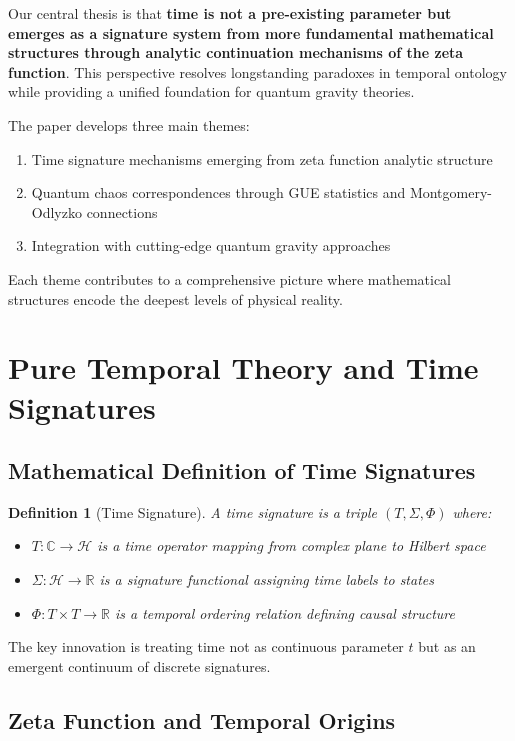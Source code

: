 \documentclass[12pt]{article}
\newtheorem{definition}[theorem]{Definition}
\begin{document}
Our central thesis is that \textbf{time is not a pre-existing parameter but emerges as a signature system from more fundamental mathematical structures through analytic continuation mechanisms of the zeta function}. This perspective resolves longstanding paradoxes in temporal ontology while providing a unified foundation for quantum gravity theories.

The paper develops three main themes:
\begin{enumerate}
\item Time signature mechanisms emerging from zeta function analytic structure
\item Quantum chaos correspondences through GUE statistics and Montgomery-Odlyzko connections
\item Integration with cutting-edge quantum gravity approaches
\end{enumerate}

Each theme contributes to a comprehensive picture where mathematical structures encode the deepest levels of physical reality.

\section{Pure Temporal Theory and Time Signatures}

\subsection{Mathematical Definition of Time Signatures}

\begin{definition}[Time Signature]
A time signature is a triple $(T, \Sigma, \Phi)$ where:
\begin{itemize}
\item $T: \mathbb{C} \to \mathcal{H}$ is a time operator mapping from complex plane to Hilbert space
\item $\Sigma: \mathcal{H} \to \mathbb{R}$ is a signature functional assigning time labels to states
\item $\Phi: T \times T \to \mathbb{R}$ is a temporal ordering relation defining causal structure
\end{itemize}
\end{definition}

The key innovation is treating time not as continuous parameter $t$ but as an emergent continuum of discrete signatures.

\subsection{Zeta Function and Temporal Origins}
\end{document}
